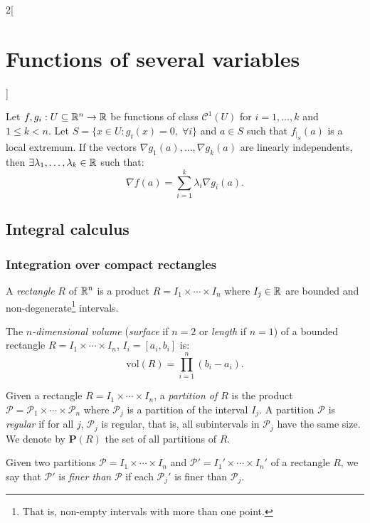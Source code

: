 \documentclass[../../../main.tex]{subfiles}
\begin{document}
\begin{multicols}{2}[\section{Functions of several variables}]
\begin{theorem}
\begin{enumerate}
\end{enumerate}
\end{theorem}
\begin{theorem}
Let $f,g_i:U\subseteq\mathbb{R}^n\rightarrow\mathbb{R} $ be functions of class $\mathcal{C}^1(U)$ for $i=1,\ldots,k$ and $1\leq k<n$. Let $S=\{x\in U:g_i(x)=0,\;\forall i\}$ and $a\in S$ such that $f_{|_S}(a)$ is a local extremum. If the vectors $\nabla g_1(a),\ldots,\nabla g_k(a)$ are linearly independents, then $\exists\lambda_1,\ldots,\lambda_k\in\mathbb{R} $ such that: $$\nabla f(a)=\sum_{i=1}^k\lambda_i\nabla g_i(a).$$
\end{theorem}
\subsection{Integral calculus}
\subsubsection*{Integration over compact rectangles}
\begin{definition}
A \textit{rectangle} $R$ of $\mathbb{R}^n$ is a product $R=I_1\times\cdots\times I_n$ where $I_j\in\mathbb{R} $ are bounded and non-degenerate\footnote{That is, non-empty intervals with more than one point.} intervals.
\end{definition}
\begin{definition}
The \textit{$n$-dimensional volume} (\textit{surface} if $n=2$ or \textit{length} if $n=1$) of a bounded rectangle $R=I_1\times\cdots\times I_n$, $I_i=[a_i,b_i]$ is: $$\text{vol}(R)=\prod_{i=1}^n(b_i-a_i).$$
\end{definition}
\begin{definition}
Given a rectangle $R=I_1\times\cdots\times I_n$, a \textit{partition of $R$} is the product $\mathcal{P}=\mathcal{P}_1\times\cdots\times\mathcal{P}_n$ where $\mathcal{P}_j$ is a partition of the interval $I_j$. A partition $\mathcal{P}$ is \textit{regular} if for all $j$, $\mathcal{P}_j$ is regular, that is, all subintervals in $\mathcal{P}_j$ have the same size. We denote by $\textbf{P}(R)$ the set of all partitions of $R$.
\end{definition}
\begin{definition}
Given two partitions $\mathcal{P}=I_1\times\cdots\times I_n$ and $\mathcal{P}'=I_1'\times\cdots\times I_n'$ of a rectangle $R$, we say that $\mathcal{P}'$ is \textit{finer than} $\mathcal{P}$ if each $\mathcal{P}_j'$ is finer than $\mathcal{P}_j$.
\end{definition}

\end{multicols}
\end{document}
